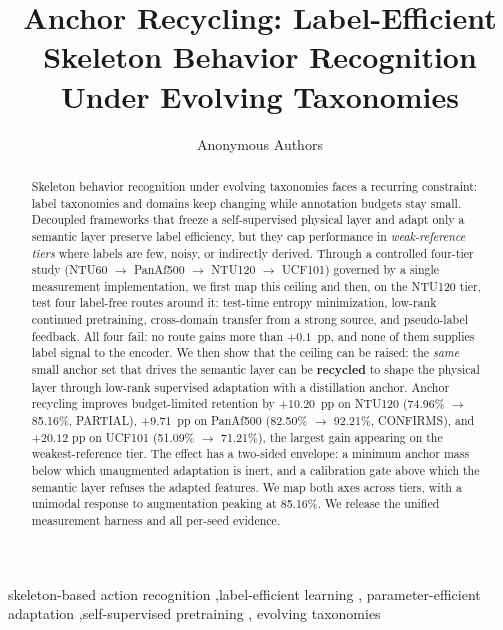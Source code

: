 \documentclass[preprint,12pt,number]{elsarticle}
\begin{document}
\begin{frontmatter}

\title{Anchor Recycling: Label-Efficient Skeleton Behavior Recognition Under Evolving Taxonomies}

\author[1]{Anonymous Authors}

\begin{abstract}
Skeleton behavior recognition under evolving taxonomies faces a recurring
constraint: label taxonomies and domains keep changing while annotation
budgets stay small. Decoupled frameworks that freeze a self-supervised physical layer and
adapt only a semantic layer preserve label efficiency, but they cap
performance in \emph{weak-reference tiers} where labels are few, noisy, or
indirectly derived. Through a controlled four-tier study (NTU60 $\rightarrow$ PanAf500 $\rightarrow$
NTU120 $\rightarrow$ UCF101) governed by a single measurement implementation, we first map
this ceiling and then, on the NTU120 tier, test four label-free routes around
it: test-time entropy minimization, low-rank continued pretraining,
cross-domain transfer from a strong source, and pseudo-label feedback. All
four fail: no route gains more than $+0.1$~pp, and none of them supplies label
signal to the encoder. We then show that the ceiling can be raised: the \emph{same} small anchor set
that drives the semantic layer can be \textbf{recycled} to shape the physical layer
through low-rank supervised adaptation with a distillation anchor. Anchor
recycling improves budget-limited retention by $+10.20$~pp on NTU120 (74.96\% $\rightarrow$
85.16\%, PARTIAL), $+9.71$~pp on PanAf500 (82.50\% $\rightarrow$ 92.21\%, CONFIRMS), and $+20.12$
pp on UCF101 (51.09\% $\rightarrow$ 71.21\%), the largest gain appearing on the
weakest-reference tier. The effect has a two-sided envelope: a minimum anchor mass below
which unaugmented adaptation is inert, and a calibration gate above which the semantic
layer refuses the adapted features. We map both axes across tiers, with a
unimodal response to augmentation peaking at 85.16\%. We release the unified
measurement harness and all per-seed evidence.
\end{abstract}

\begin{keyword}
skeleton-based action recognition \sep label-efficient learning \sep
parameter-efficient adaptation \sep self-supervised pretraining \sep
evolving taxonomies
\end{keyword}

\end{frontmatter}
\end{document}
